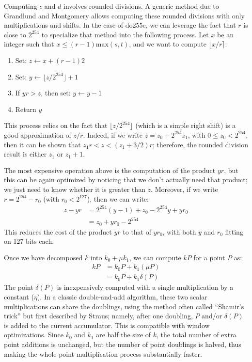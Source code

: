 \documentclass{llncs}
\begin{document}
Computing $c$ and $d$ involves rounded divisions. A generic method due
to Grandlund and Montgomery\cite{GraMon1994} allows computing these
rounded divisions with only multiplications and shifts. In the case of
do255e, we can leverage the fact that $r$ is close to $2^{254}$ to
specialize that method into the following process. Let $x$ be an integer
such that $x\leq (r-1)\text{max}(s, t)$, and we want to compute $\lfloor
x/r \rceil$:
\begin{enumerate}
    \item Set: $z \leftarrow x + (r-1)2$
    \item Set: $y \leftarrow \lfloor z / 2^{254} \rfloor + 1$
    \item If $yr > z$, then set: $y \leftarrow y-1$
    \item Return $y$
\end{enumerate}
This process relies on the fact that $\lfloor z / 2^{254}\rfloor$ (which
is a simple right shift) is a good approximation of $z/r$. Indeed, if
we write $z = z_0 + 2^{254} z_1$, with $0\leq z_0 < 2^{254}$, then
it can be shown that $z_1 r < z < (z_1 + 3/2)r$; therefore, the rounded
division result is either $z_1$ or $z_1 + 1$.

The most expensive operation above is the computation of the product
$yr$, but this can be again optimized by noticing that we don't actually
need that product; we just need to know whether it is greater than $z$.
Moreover, if we write $r = 2^{254} - r_0$ (with $r_0 < 2^{127}$), then
we can write:
\begin{align*}
    z - yr &= 2^{254}(y - 1) + z_0 - 2^{254} y + y r_0 \\
           &= z_0 + y r_0 - 2^{254}
\end{align*}
This reduces the cost of the product $y r$ to that of $y r_0$, with
both $y$ and $r_0$ fitting on 127 bits each.

Once we have decomposed $k$ into $k_0 + \mu k_1$, we can compute
$kP$ for a point $P$ as:
\begin{align*}
    k P &= k_0 P + k_1 (\mu P) \\
        &= k_0 P + k_1 \delta(P)
\end{align*}
The point $\delta(P)$ is inexpensively computed with a single
multiplication by a constant ($\eta$). In a classic double-and-add
algorithm, these two scalar multiplications can share the doublings,
using the method often called ``Shamir's trick'' but first described by
Straus\cite{Str1964}; namely, after one doubling, $P$ and/or $\delta(P)$
is added to the current accumulator. This is compatible with window
optimizations. Since $k_0$ and $k_1$ are half the size of $k$, the total
number of extra point additions is unchanged, but the number of point
doublings is halved, thus making the whole point multiplication process
substantially faster.
\end{document}
